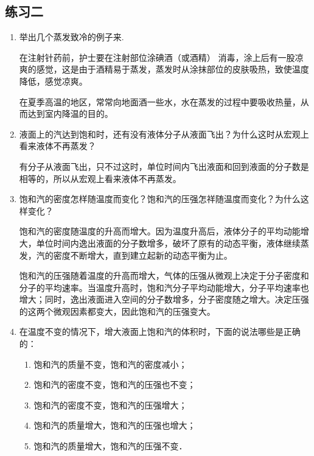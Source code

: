 \subsection{练习二}

\begin{enumerate}
    \item 举出几个蒸发致冷的例子来.
    
    \begin{solution}
在注射针药前，护士要在注射部位涂碘酒（或酒精）
消毒，涂上后有一股凉爽的感觉，这是由于酒精易于蒸发，蒸发时从涂抹部位的皮肤吸热，致使温度降低，感觉凉爽。

在夏季高温的地区，常常向地面酒一些水，水在蒸发的过程中要吸收热量，从而达到室内降温的目的。      
    \end{solution}
\item 液面上的汽达到饱和时，还有没有液体分子从液面飞出？为什么这时从宏观上看来液体不再蒸发？
    
\begin{solution}
有分子从液面飞出，只不过这时，单位时间内飞出液面和回到液面的分子数是相等的，所以从宏观上看来液体不再蒸发。
\end{solution}
\item 饱和汽的密度怎样随温度而变化？饱和汽的压强怎祥随温度而变化？为什么这样变化？
    
\begin{solution}
饱和汽的密度随温度的升高而增大。因为温度升高后，液体分子的平均动能增大，单位时间内逸出液面的分子数增多，破坏了原有的动态平衡，液体继续蒸发，汽的密度不断增大，直到建立起新的动态平衡为止。

饱和汽的压强随着温度的升高而增大，气体的压强从微观上决定于分子密度和分子的平均速率。当温度升高时，饱和汽分子平均动能增大，分子平均速率也增大；同时，逸出液面进入空间的分子数增多，分子密度随之增大。决定压强的这两个微观因素都变大，因此饱和汽的压强变大。
\end{solution}
\item 在温度不变的情况下，增大液面上饱和汽的体积时，下面的说法哪些是正确的：
\begin{enumerate}
    \item 饱和汽的质量不变，饱和汽的密度减小；
    \item 饱和汽的密度不变，饱和汽的压强也不变；
    \item 饱和汽的密度不变，饱和汽的压强增大；
    \item 饱和汽的质量增大，饱和汽的压强也增大；
    \item 饱和汽的质量增大，饱和汽的压强不变．
\end{enumerate}


\end{enumerate}
